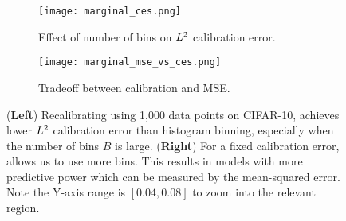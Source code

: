 \begin{figure}
  \centering
  \centering
     \begin{subfigure}[b]{0.54\textwidth}
         \centering
         \texttt{[image: marginal\_ces.png]}
         \caption{Effect of number of bins on $L^2{}$ calibration error. }
         \label{fig:marginal_calibrator_comparison_cifar}
     \end{subfigure}
     \hfill
     \begin{subfigure}[b]{0.44\textwidth}
         \centering
         \texttt{[image: marginal\_mse\_vs\_ces.png]}
         \caption{Tradeoff between calibration and MSE. }
         \label{fig:cifar_calibrator_cmp_mse_ce}
     \end{subfigure}
  \caption{
  (\textbf{Left}) Recalibrating using 1,000 data points on CIFAR-10, \ourcal{} achieves lower $L^2{}$ calibration error than histogram binning, especially when the number of bins $B$ is large.
  (\textbf{Right}) For a fixed calibration error, \ourcal{} allows us to use more bins. This results in models with more predictive power which can be measured by the mean-squared error. Note the  Y-axis range is $[0.04, 0.08]$ to zoom into the relevant region.
  }
  \label{fig:nan2}
\end{figure}
